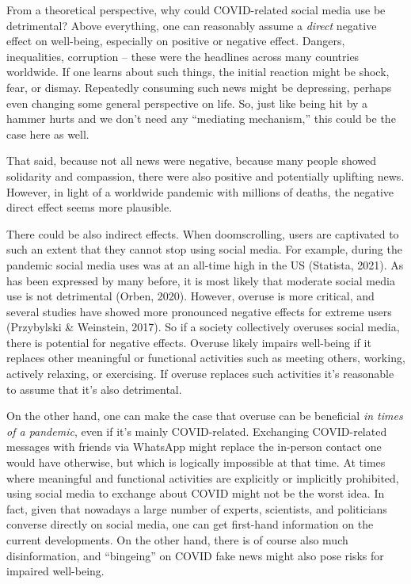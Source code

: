 \documentclass[
  english,
  man,floatsintext]{apa6}
\begin{document}
From a theoretical perspective, why could COVID-related social media use be detrimental?
Above everything, one can reasonably assume a \emph{direct} negative effect on well-being, especially on positive or negative effect.
Dangers, inequalities, corruption -- these were the headlines across many countries worldwide.
If one learns about such things, the initial reaction might be shock, fear, or dismay.
Repeatedly consuming such news might be depressing, perhaps even changing some general perspective on life.
So, just like being hit by a hammer hurts and we don't need any ``mediating mechanism,'' this could be the case here as well.

That said, because not all news were negative, because many people showed solidarity and compassion,
there were also positive and potentially uplifting news.
However, in light of a worldwide pandemic with millions of deaths, the negative direct effect seems more plausible.

There could be also indirect effects.
When doomscrolling, users are captivated to such an extent that they cannot stop using social media.
For example, during the pandemic social media uses was at an all-time high in the US (Statista, 2021).
As has been expressed by many before, it is most likely that moderate social media use is not detrimental (Orben, 2020).
However, overuse is more critical, and several studies have showed more pronounced negative effects for extreme users (Przybylski \& Weinstein, 2017).
So if a society collectively overuses social media, there is potential for negative effects.
Overuse likely impairs well-being if it replaces other meaningful or functional activities such as meeting others, working, actively relaxing, or exercising.
If overuse replaces such activities it's reasonable to assume that it's also detrimental.

On the other hand, one can make the case that overuse can be beneficial \emph{in times of a pandemic}, even if it's mainly COVID-related.
Exchanging COVID-related messages with friends via WhatsApp might replace the in-person contact one would have otherwise, but which is logically impossible at that time.
At times where meaningful and functional activities are explicitly or implicitly prohibited, using social media to exchange about COVID might not be the worst idea.
In fact, given that nowadays a large number of experts, scientists, and politicians converse directly on social media, one can get first-hand information on the current developments.
On the other hand, there is of course also much disinformation, and ``bingeing'' on COVID fake news might also pose risks for impaired well-being.
\end{document}
